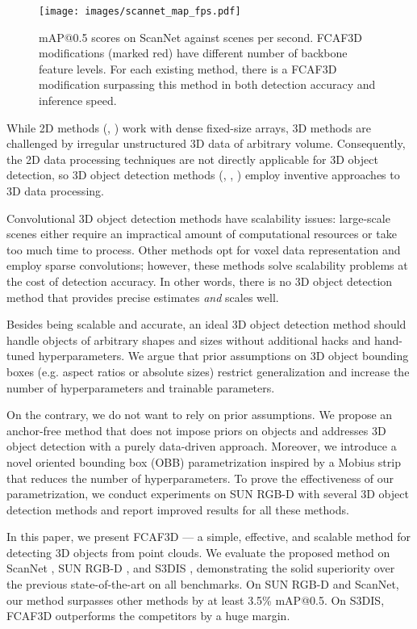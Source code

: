 \documentclass[runningheads]{llncs}
\begin{document}
\begin{figure}[h!]
    \centering
        \texttt{[image: images/scannet\_map\_fps.pdf]}
    \caption{mAP@0.5 scores on ScanNet against scenes per second. FCAF3D modifications (marked red) have different number of backbone feature levels. For each existing method, there is a FCAF3D modification surpassing this method in both detection accuracy and inference speed.}
    \label{fig:fps}
\end{figure}

While 2D methods (\cite{tian2019fcos}, \cite{zhang2020atss}) work with dense fixed-size arrays, 3D methods are challenged by irregular unstructured 3D data of arbitrary volume. Consequently, the 2D data processing techniques are not directly applicable for 3D object detection, so 3D object detection methods (\cite{gwak2020gsdn}, \cite{qi2019votenet}, \cite{misra20213detr}) employ inventive approaches to 3D data processing. 

Convolutional 3D object detection methods have scalability issues: large-scale scenes either require an impractical amount of computational resources or take too much time to process. Other methods opt for voxel data representation and employ sparse convolutions; however, these methods solve scalability problems at the cost of detection accuracy. In other words, there is no 3D object detection method that provides precise estimates \emph{and} scales well.

Besides being scalable and accurate, an ideal 3D object detection method should handle objects of arbitrary shapes and sizes without additional hacks and hand-tuned hyperparameters. We argue that prior assumptions on 3D object bounding boxes (e.g. aspect ratios or absolute sizes) restrict generalization and increase the number of hyperparameters and trainable parameters. 

On the contrary, we do not want to rely on prior assumptions. We propose an anchor-free method that does not impose priors on objects and addresses 3D object detection with a purely data-driven approach. Moreover, we introduce a novel oriented bounding box (OBB) parametrization inspired by a Mobius strip that reduces the number of hyperparameters. To prove the effectiveness of our parametrization, we conduct experiments on SUN RGB-D with several 3D object detection methods and report improved results for all these methods.

In this paper, we present FCAF3D --- a simple, effective, and scalable method for detecting 3D objects from point clouds. We evaluate the proposed method on ScanNet \cite{dai2017scannet}, SUN RGB-D \cite{song2015sunrgbd}, and S3DIS \cite{armeni2016s3dis}, demonstrating the solid superiority over the previous state-of-the-art on all benchmarks. On SUN RGB-D and ScanNet, our method surpasses other methods by at least 3.5\% mAP@0.5. On S3DIS, FCAF3D outperforms the competitors by a huge margin.
\end{document}
